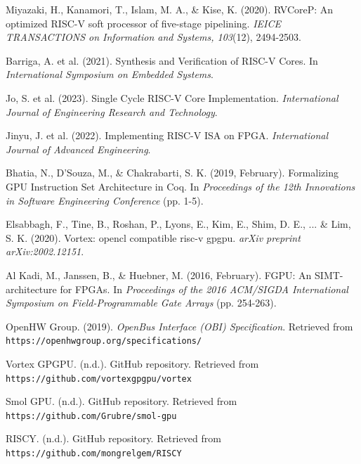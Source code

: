 \documentclass[a4paper,twoside]{article}
\begin{document}
\begin{thebibliography}{99}
Miyazaki, H., Kanamori, T., Islam, M. A., \& Kise, K. (2020). RVCoreP: An optimized RISC-V soft processor of five-stage pipelining. \textit{IEICE TRANSACTIONS on Information and Systems, 103}(12), 2494-2503.

Barriga, A. et al. (2021). Synthesis and Verification of RISC-V Cores. In \textit{International Symposium on Embedded Systems}.

Jo, S. et al. (2023). Single Cycle RISC-V Core Implementation. \textit{International Journal of Engineering Research and Technology}.

Jinyu, J. et al. (2022). Implementing RISC-V ISA on FPGA. \textit{International Journal of Advanced Engineering}.

Bhatia, N., D'Souza, M., \& Chakrabarti, S. K. (2019, February). Formalizing GPU Instruction Set Architecture in Coq. In \textit{Proceedings of the 12th Innovations in Software Engineering Conference} (pp. 1-5).

Elsabbagh, F., Tine, B., Roshan, P., Lyons, E., Kim, E., Shim, D. E., ... \& Lim, S. K. (2020). Vortex: opencl compatible risc-v gpgpu. \textit{arXiv preprint arXiv:2002.12151}.

Al Kadi, M., Janssen, B., \& Huebner, M. (2016, February). FGPU: An SIMT-architecture for FPGAs. In \textit{Proceedings of the 2016 ACM/SIGDA International Symposium on Field-Programmable Gate Arrays} (pp. 254-263).

OpenHW Group. (2019). \textit{OpenBus Interface (OBI) Specification}. Retrieved from \texttt{https://openhwgroup.org/specifications/}

Vortex GPGPU. (n.d.). GitHub repository. Retrieved from \texttt{https://github.com/vortexgpgpu/vortex}

Smol GPU. (n.d.). GitHub repository. Retrieved from \texttt{https://github.com/Grubre/smol-gpu}

RISCY. (n.d.). GitHub repository. Retrieved from \texttt{https://github.com/mongrelgem/RISCY}

\end{thebibliography}
\end{document}
